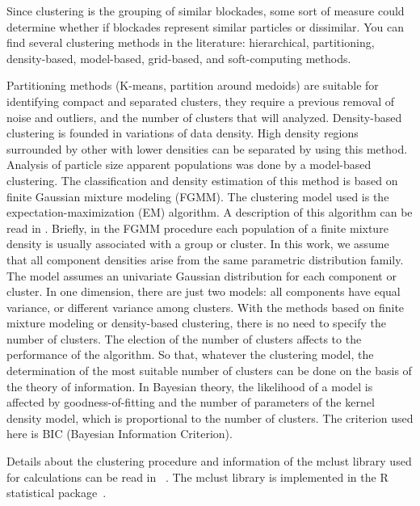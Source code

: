 \documentclass[journal=langd5,manuscript=article]{achemso}
\begin{document}
Since clustering is the grouping of similar blockades, some sort of measure could determine whether if blockades represent similar particles or dissimilar. You can find several  clustering methods in the literature:  hierarchical,  partitioning,  density-based,  model-based,  grid-based, and  soft-computing  methods\cite{Rokach2005}.
% 
% 

Partitioning methods (K-means, partition around medoids) are suitable for identifying compact and separated clusters, they require a previous removal of noise and outliers, and the number of clusters that will analyzed. 
Density-based clustering is founded in variations of data density. High density regions surrounded by other with lower densities can be separated by using this method. 
Analysis of particle size apparent populations was done by a model-based clustering. The classification and density estimation of this method is based on finite Gaussian mixture modeling (FGMM). The clustering model used is the expectation-maximization (EM) algorithm. A description  of this algorithm can be read in \citeauthor{Do2008}  
% 
% 
\cite{Do2008}. Briefly, in the FGMM procedure each population of a finite  mixture density is usually associated with a group or cluster. In this work, we assume that all component densities arise from the same parametric distribution family. The model assumes an univariate Gaussian distribution for each component or cluster. In one dimension, there are just two models: all components have equal variance, or different variance among clusters.
With the methods based on finite mixture modeling or density-based clustering, there is no need to specify the number of clusters. The election of the number of clusters affects to the performance of the algorithm. So that, whatever the clustering model, the
determination of the most suitable number of clusters can be done on the basis of the theory of information. In Bayesian
theory, the likelihood of a model is affected by goodness-of-fitting and the number of parameters of the kernel density model, which is proportional to the number of clusters. The criterion used here is BIC (Bayesian Information Criterion).

Details about the clustering procedure and information of the mclust library used for calculations can be read in
~\citeauthor{Fraley2012MclustEstimation}\cite{Fraley2012MclustEstimation}. The mclust library is implemented in the R statistical package~\cite{RCoreTeam2011}.
\end{document}
